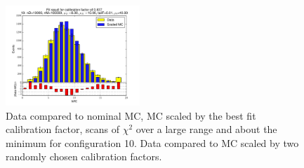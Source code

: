 \begin{figure}[htbp]
\begin{center}
\includegraphics[width=0.45\textwidth]{../FIGURES/10/FIG_Fit_result_for_calibration_factor_of_0_837.pdf} 
\caption{Data compared to nominal MC, MC scaled by the best fit calibration factor, scans of $\chi^2$ over a large range and about the minimum for configuration 10. Data compared to MC scaled by two randomly chosen calibration factors.} 
\label{tab:best_10} 
\end{center} \end{figure} 


